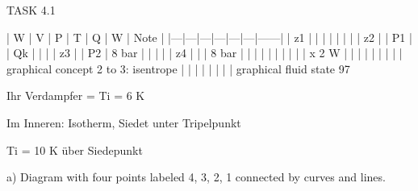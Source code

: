 TASK 4.1

| W | V | P | T | Q | W | Note |
|---|---|---|---|---|---|------|
| z1 |   |   |   |   |   |   |
| z2 |   | P1 |   | Qk |   |   |
| z3 |   | P2 | 8 bar |   |   |   |
| z4 |   |   | 8 bar |   |   |   |
|   |   |   |   |   | x 2 W |   |
|   |   |   |   |   |   | graphical concept 2 to 3: isentrope |
|   |   |   |   |   |   | graphical fluid state 97%

Ihr Verdampfer = Ti = 6 K

Im Inneren: Isotherm, Siedet unter Tripelpunkt

Ti = 10 K über Siedepunkt

a) Diagram with four points labeled 4, 3, 2, 1 connected by curves and lines.